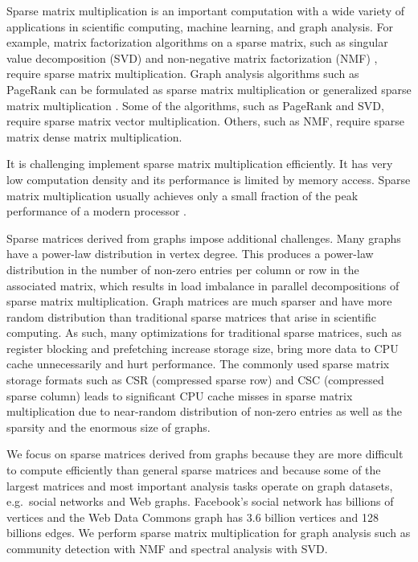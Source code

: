 Sparse matrix multiplication is an important computation with a wide variety
of applications in scientific computing, machine learning, and graph analysis.
For example, matrix factorization algorithms on a sparse matrix, such as
singular value decomposition (SVD) \cite{svd} and non-negative matrix
factorization (NMF) \cite{nmf}, require sparse matrix multiplication.
Graph analysis algorithms such as PageRank \cite{pagerank} can be
formulated as sparse matrix multiplication or generalized sparse matrix
multiplication \cite{Mattson13}. Some of
the algorithms, such as PageRank and SVD, require sparse matrix vector
multiplication. Others, such as NMF, require sparse matrix dense
matrix multiplication.

It is challenging implement sparse matrix multiplication efficiently. 
It has very low computation density and its
performance is limited by memory access. Sparse matrix multiplication usually achieves only
a small fraction of the peak performance of a modern processor \cite{Williams07}.

Sparse matrices derived from graphs impose additional challenges.
Many graphs have a power-law distribution in vertex
degree.  This produces a power-law distribution in the number of non-zero 
entries per column or row in the associated matrix, which   
results in load imbalance in parallel decompositions of sparse 
matrix multiplication. 
Graph matrices are much sparser and have more random distribution 
than traditional sparse matrices that arise in scientific
computing. As such, many optimizations for traditional sparse matrices, such
as register blocking and prefetching \cite{Williams07} increase storage size,
bring more data to CPU cache unnecessarily and hurt performance.
The commonly used sparse matrix storage formats such as CSR (compressed sparse
row) and CSC (compressed sparse column) leads to significant CPU cache misses
in sparse matrix multiplication due to near-random distribution of non-zero
entries as well as the sparsity and the enormous size of graphs. 

We focus on sparse matrices derived from graphs because they are more difficult 
to compute efficiently than general sparse matrices and because some of the 
largest matrices and most important analysis tasks operate on graph datasets, 
e.g.~social networks and Web graphs. 
Facebook's social network has billions of vertices and
the Web Data Commons graph \cite{web_graph} has 3.6 billion vertices and 128
billions edges. We perform sparse matrix multiplication for graph
analysis such as community detection with NMF and spectral analysis with SVD.

